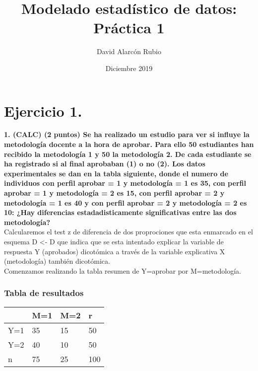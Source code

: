 \documentclass[12pt,spanish]{article}
\title{Modelado estadístico de datos: Práctica 1}
\author{David Alarcón Rubio}
\date{Diciembre 2019}
\begin{document}
	
	\maketitle
	
	
	\part*{Ejercicio 1.}	
	
	\textbf{1. (CALC) (2 puntos) Se ha realizado un estudio para ver si influye la metodología docente a la hora de aprobar. Para ello 50 estudiantes han recibido la metodología 1 y 50 la metodología 2. De cada estudiante se ha registrado si al final aprobaban (1) o no (2). Los datos experimentales se dan en la tabla siguiente, donde el numero de individuos con perfil aprobar = 1 y metodología = 1 es 35, con perfil aprobar = 1 y metodología = 2 es 15, con perfil aprobar = 2 y metodología = 1 es 40 y con perfil aprobar = 2 y
		metodología = 2 es 10: ¿Hay diferencias estadadisticamente significativas entre las dos metodología?}\\
	
	Calcularemos el test z de diferencia de dos proprociones que esta enmarcado en el esquema D <- D que indica que se esta intentado explicar la variable de respuesta Y (aprobados)  dicotómica a través de la variable explicativa X (metodología) también dicotómica.\\
	
	Comenzamos realizando la tabla resumen de Y=aprobar por M=metodología.\\
	
	\section*{Tabla de resultados}
	\begin{table}[h]
		\begin{tabular}{l|l|l|l|}
			\cline{2-4}
			& M=1 & M=2 & r \\ \hline
			\multicolumn{1}{|l|}{Y=1} & 35 & 15 & 50 \\ \hline
			\multicolumn{1}{|l|}{Y=2} & 40 & 10 & 50 \\ \hline
			\multicolumn{1}{|l|}{n} & 75 & 25 & 100 \\ \hline
		\end{tabular}
	\end{table}
	
\end{document}

